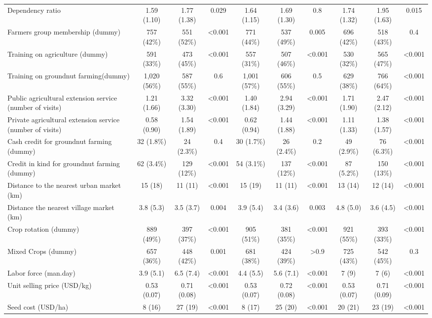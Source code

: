\documentclass[
]{article}
\begin{document}
\begin{landscape}
\begin{table}[!h]
{\begin{tabular}[t]{lccccccccc}
Dependency ratio & 1.59 (1.10) & 1.77 (1.38) & 0.029 & 1.64 (1.15) & 1.69 (1.30) & 0.8 & 1.74 (1.32) & 1.95 (1.63) & 0.015\\
Farmers group membership (dummy) & 757 (42\%) & 551 (52\%) & <0.001 & 771 (44\%) & 537 (49\%) & 0.005 & 696 (42\%) & 518 (43\%) & 0.4\\
\addlinespace
Training on agriculture (dummy) & 591 (33\%) & 473 (45\%) & <0.001 & 557 (31\%) & 507 (46\%) & <0.001 & 530 (32\%) & 565 (47\%) & <0.001\\
Training on groundnut farming(dummy) & 1,020 (56\%) & 587 (55\%) & 0.6 & 1,001 (57\%) & 606 (55\%) & 0.5 & 629 (38\%) & 766 (64\%) & <0.001\\
Public agricultural extension service (number of visits) & 1.21 (1.66) & 3.32 (3.30) & <0.001 & 1.40 (1.84) & 2.94 (3.29) & <0.001 & 1.71 (1.90) & 2.47 (2.12) & <0.001\\
Private agricultural extension service (number of visits) & 0.58 (0.90) & 1.54 (1.89) & <0.001 & 0.62 (0.94) & 1.44 (1.88) & <0.001 & 1.11 (1.33) & 1.38 (1.57) & <0.001\\
Cash credit for groundnut farming (dummy) & 32 (1.8\%) & 24 (2.3\%) & 0.4 & 30 (1.7\%) & 26 (2.4\%) & 0.2 & 49 (2.9\%) & 76 (6.3\%) & <0.001\\
\addlinespace
Credit in kind for groundnut farming (dummy) & 62 (3.4\%) & 129 (12\%) & <0.001 & 54 (3.1\%) & 137 (12\%) & <0.001 & 87 (5.2\%) & 150 (13\%) & <0.001\\
Distance to the nearest urban market (km) & 15 (18) & 11 (11) & <0.001 & 15 (19) & 11 (11) & <0.001 & 13 (14) & 12 (14) & <0.001\\
Distance the nearest village market (km) & 3.8 (5.3) & 3.5 (3.7) & 0.004 & 3.9 (5.4) & 3.4 (3.6) & 0.003 & 4.8 (5.0) & 3.6 (4.5) & <0.001\\
Crop rotation (dummy) & 889 (49\%) & 397 (37\%) & <0.001 & 905 (51\%) & 381 (35\%) & <0.001 & 921 (55\%) & 393 (33\%) & <0.001\\
Mixed Crops (dummy) & 657 (36\%) & 448 (42\%) & 0.001 & 681 (38\%) & 424 (39\%) & >0.9 & 725 (43\%) & 542 (45\%) & 0.3\\
\addlinespace
Labor force (man.day) & 3.9 (5.1) & 6.5 (7.4) & <0.001 & 4.4 (5.5) & 5.6 (7.1) & <0.001 & 7 (9) & 7 (6) & <0.001\\
Unit selling price (USD/kg) & 0.53 (0.07) & 0.71 (0.08) & <0.001 & 0.53 (0.07) & 0.72 (0.08) & <0.001 & 0.53 (0.07) & 0.71 (0.09) & <0.001\\
Seed cost (USD/ha) & 8 (16) & 27 (19) & <0.001 & 8 (17) & 25 (20) & <0.001 & 20 (21) & 23 (19) & <0.001\\

\end{tabular}}
\end{table}
\end{landscape}
\end{document}
